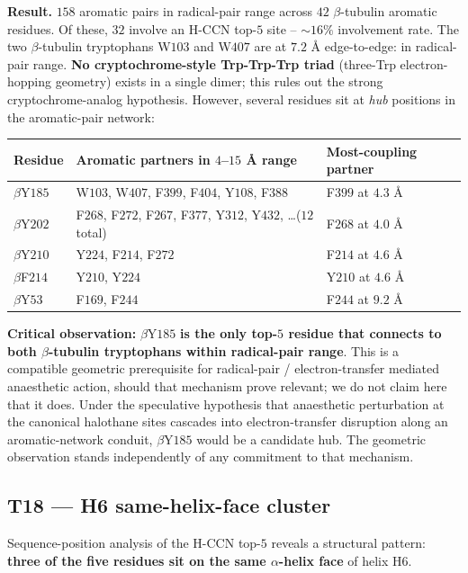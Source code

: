 \documentclass[11pt,a4paper]{article}
\begin{document}
\textbf{Result.} $158$ aromatic pairs in radical-pair range across
$42$ $\beta$-tubulin aromatic residues. Of these, $32$ involve an
H-CCN top-$5$ site -- $\sim\!16\%$ involvement rate.
The two $\beta$-tubulin tryptophans W$103$ and W$407$ are at
$7.2$ \AA{} edge-to-edge: in radical-pair range. \textbf{No
cryptochrome-style Trp-Trp-Trp triad} (three-Trp electron-hopping
geometry) exists in a single dimer; this rules out the strong
cryptochrome-analog hypothesis. However, several residues sit at
\emph{hub} positions in the aromatic-pair network:

\begin{center}\small
\begin{tabular}{lll}\toprule
Residue & Aromatic partners in $4$--$15$ \AA{} range & Most-coupling partner \\\midrule
$\beta$Y$185$ & W$103$, W$407$, F$399$, F$404$, Y$108$, F$388$ & F$399$ at $4.3$ \AA{} \\
$\beta$Y$202$ & F$268$, F$272$, F$267$, F$377$, Y$312$, Y$432$, \dots ($12$ total) & F$268$ at $4.0$ \AA{} \\
$\beta$Y$210$ & Y$224$, F$214$, F$272$ & F$214$ at $4.6$ \AA{} \\
$\beta$F$214$ & Y$210$, Y$224$ & Y$210$ at $4.6$ \AA{} \\
$\beta$Y$53$ & F$169$, F$244$ & F$244$ at $9.2$ \AA{} \\
\bottomrule\end{tabular}
\end{center}

\textbf{Critical observation:} $\beta$Y$185$ \textbf{is the only
top-$5$ residue that connects to both $\beta$-tubulin tryptophans
within radical-pair range}. This is a compatible geometric
prerequisite for radical-pair / electron-transfer mediated
anaesthetic action, should that mechanism prove relevant; we do
not claim here that it does. Under the speculative hypothesis that
anaesthetic perturbation at the canonical halothane sites cascades
into electron-transfer disruption along an aromatic-network conduit,
$\beta$Y$185$ would be a candidate hub. The geometric observation
stands independently of any commitment to that mechanism.

\subsection{\textsf{T18} --- H6 same-helix-face cluster}\label{ssec:t18}

Sequence-position analysis of the H-CCN top-$5$ reveals a structural
pattern: \textbf{three of the five residues sit on the same
$\alpha$-helix face} of helix H$6$.
\end{document}
